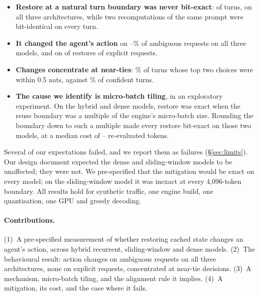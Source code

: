 \begin{itemize}
\item \textbf{Restore at a natural turn boundary was never bit-exact}:
  \NatInexact{} of \NatTurns{} turns, on all three architectures, while two
  recomputations of the same prompt were bit-identical on every turn.
\item \textbf{It changed the agent's action} on
  \ASparkNatShortAmbPct--\AOrnithNatLongAmbPct\% of ambiguous requests on all
  three models, and on \ExplicitChanges{} of \ExplicitRestores{} restores of
  explicit requests.
\item \textbf{Changes concentrate at near-ties}: \MarginAllNearTiePct\% of
  turns whose top two choices were within 0.5 nats, against
  \MarginAllConfidentPct\% of confident turns.
\item \textbf{The cause we identify is micro-batch tiling}, in an exploratory
  experiment. On the hybrid and dense models, restore was exact when the reuse
  boundary was a multiple of the engine's micro-batch size. Rounding the
  boundary down to such a multiple made every restore bit-exact on those two
  models, at a median cost of \SnapCostMin--\SnapCostMax{} re-evaluated tokens.
\end{itemize}

Several of our expectations failed, and we report them as failures
(\S\ref{sec:limits}). Our design document expected the dense and sliding-window
models to be unaffected; they were not. We pre-specified that the mitigation
would be exact on every model; on the sliding-window model it was inexact at
every 4{,}096-token boundary. All results hold for synthetic traffic, one
engine build, one quantisation, one GPU and greedy decoding.

\paragraph{Contributions.}
(1)~A pre-specified measurement of whether restoring cached state changes an
agent's action, across hybrid recurrent, sliding-window and dense models.
(2)~The behavioural result: action changes on ambiguous requests on all three
architectures, none on explicit requests, concentrated at near-tie decisions.
(3)~A mechanism, micro-batch tiling, and the alignment rule it implies.
(4)~A mitigation, its cost, and the case where it fails.
